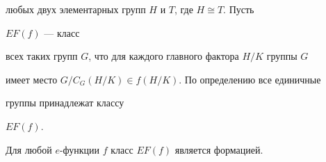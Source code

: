 любых двух элементарных групп $H$ и $T$, где $H\cong T$. Пусть


$EF(f)$ --- класс


всех таких групп $G$, что для каждого главного фактора $H/K$ группы $G$


имеет место $G/C_G(H/K)\in f(H/K)$. По определению все единичные


группы принадлежат классу


$EF(f)$.





\begin{prop}


Для любой $e$-функции $f$ класс $EF(f)$ является формацией.


\end{prop}





